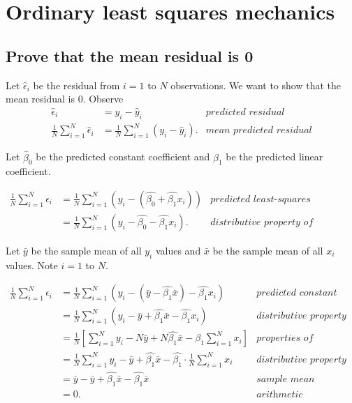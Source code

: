 \documentclass[12pt]{article}
\begin{document}
\section{Ordinary least squares mechanics}
\subsection{Prove that the mean residual is 0}
Let $\hat{\epsilon}_i$ be the residual from $i=1$ to $N$ observations. We want to show that the mean residual is 0. Observe
\begin{align*}
\hat{\epsilon}_i&=y_i-\hat{y}_i&\textit{predicted residual}\\
\frac{1}{N}\sum_{i=1}^N{\hat{\epsilon}_i}&=\frac{1}{N}\sum_{i=1}^N{(y_i-\hat{y}_i)}.&\textit{mean predicted residual}
\end{align*}

Let $\hat{\beta}_0$ be the predicted constant coefficient and $\hat{\beta}_1$ be the predicted linear coefficient.

\begin{align*}
\frac{1}{N}\sum_{i=1}^N{\hat{\epsilon}_i}
&=\frac{1}{N}\sum_{i=1}^N{\left(y_i-(\hat{\beta_0}+\hat{\beta_1}x_i)\right)}&\textit{predicted least-squares regression equation}\\
&=\frac{1}{N}\sum_{i=1}^N{(y_i-\hat{\beta_0}-\hat{\beta_1}x_i)}.&\textit{distributive property of negation}
\end{align*}

Let $\bar{y}$ be the sample mean of all $y_i$ values and $\bar{x}$ be the sample mean of all $x_i$ values. Note $i=1$ to $N$.

\begin{align*}
\frac{1}{N}\sum_{i=1}^N{\hat{\epsilon}_i}
&=\frac{1}{N}\sum_{i=1}^N{\left(y_i-(\bar{y}-\hat{\beta_1}\bar{x})-\hat{\beta_1}x_i\right)}&\textit{predicted constant coefficient}\\
&=\frac{1}{N}\sum_{i=1}^N{(y_i-\bar{y}+\hat{\beta_1}\bar{x}-\hat{\beta_1}x_i)}&\textit{distributive property of negation}\\
&=\frac{1}{N}\left[\sum_{i=1}^N{y_i}-N\bar{y}+N\hat{\beta_1}\bar{x}-\hat{\beta_1}\sum_{i=1}^N{x_i}\right]&\textit{properties of summation}\\
&=\frac{1}{N}\sum_{i=1}^N{y_i}-\bar{y}+\hat{\beta_1}\bar{x}-\hat{\beta_1}\cdot\frac{1}{N}\sum_{i=1}^N{x_i}&\textit{distributive property of multiplication}\\
&=\bar{y}-\bar{y}+\hat{\beta_1}\bar{x}-\hat{\beta_1}\bar{x}&\textit{sample mean}\\
&=0.&\textit{arithmetic}
\end{align*}
\end{document}
